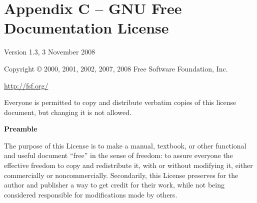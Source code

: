 \chapter{Appendix C -- GNU Free Documentation License} \label{Appendix C}
\ifdefined\chs

\fi

\ifdefined\eng
{}  %
\fi

\ifdefined\chs

\fi

\ifdefined\eng
 \begin{center}
\fi

\ifdefined\chs

\fi

\ifdefined\eng
       Version 1.3, 3 November 2008
\fi

\ifdefined\chs

\fi

\ifdefined\eng
\fi

\ifdefined\chs

\fi

\ifdefined\eng
 Copyright \copyright{} 2000, 2001, 2002, 2007, 2008  Free Software Foundation, Inc.
 
 \bigskip
 
     \url{http://fsf.org/}
  
 \bigskip
 
 Everyone is permitted to copy and distribute verbatim copies
 of this license document, but changing it is not allowed.
\end{center}
\fi

\ifdefined\chs

\fi

\ifdefined\eng
\fi

\ifdefined\chs

\fi

\ifdefined\eng
\begin{center}
{\bf\large Preamble}
\end{center}
\fi

\ifdefined\chs

\fi

\ifdefined\eng
The purpose of this License is to make a manual, textbook, or other
functional and useful document ``free'' in the sense of freedom: to
assure everyone the effective freedom to copy and redistribute it,
with or without modifying it, either commercially or noncommercially.
Secondarily, this License preserves for the author and publisher a way
to get credit for their work, while not being considered responsible
for modifications made by others.
\fi

